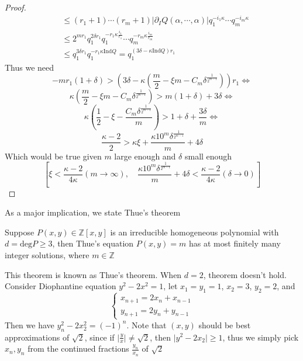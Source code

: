 \begin{proof}
$$\begin{aligned}
&\leq (r_{1}+1)\cdots(r_{m}+1) |\partial_{I}Q(\alpha,\cdots,\alpha)|
q_{1}^{-i_{1}\kappa}\cdots q_{m}^{-i_{m}\kappa} \\
&\leq 2^{mr_{1}}q_{1}^{2\delta r_{1}}q_{1}^{-r_{1}\kappa\frac{i_{1}}{r_{1}}}\cdots q_{m}^{-r_{m}\kappa\frac{i_{m}}{r_{m}}} \\
&\leq q_{1}^{3\delta r_{1}} q_{1}^{-r_{1}\kappa \mathrm{Ind}Q} = q_{1}^{(3\delta-\kappa \mathrm{Ind}Q)r_{1}}
\end{aligned}
$$
Thus we need
$$ -mr_{1}(1+\delta) > \left(3\delta-\kappa\left(\dfrac{m}{2}-\xi m-C_{m}\delta^{\frac{1}{2^{m-1}}}\right)\right)r_{1} \Leftrightarrow $$
$$ \kappa\left(\dfrac{m}{2}-\xi m-C_{m}\delta^{\frac{1}{2^{m-1}}}\right) > m(1+\delta)+3\delta \Leftrightarrow $$
$$ \kappa\left(\dfrac{1}{2}-\xi-\dfrac{C_{m}\delta^{\frac{1}{2^{m-1}}}}{m}\right) > 1+\delta+\dfrac{3\delta}{m} \Leftrightarrow $$
$$ \dfrac{\kappa-2}{2} > \kappa\xi + \dfrac{\kappa 10^{m}\delta^{\frac{1}{2^{m-1}}}}{m} + 4\delta $$
Which would be true given $ m $ large enough and $ \delta $ small enough
$$ \left[ \xi < \dfrac{\kappa-2}{4\kappa} (m\rightarrow\infty),\quad 
\dfrac{\kappa 10^{m}\delta^{\frac{1}{2^{m-1}}}}{m} + 4\delta < \dfrac{\kappa-2}{4\kappa} (\delta\rightarrow 0) \right] $$
\end{proof}

As a major implication, we state Thue's theorem

\begin{theorem}\label{theorem 42}
Suppose $ P(x,y) \in \mathbb{Z}[x,y] $ is an irreducible homogeneous polynomial with $ d=\mathrm{deg} P \geq 3 $, then Thue's equation $ P(x,y)=m $ has at most finitely many integer solutions, where $ m \in \mathbb{Z} $
\end{theorem}

\begin{remark}
This theorem is known as Thue's theorem. When $ d=2 $, theorem doesn't hold. Consider Diophantine equation $ y^{2}-2x^{2}=1 $, let $ x_{1}=y_{1}=1 $, $ x_{2}=3 $, $ y_{2} = 2 $, and 
$$
\left\{
\begin{aligned}
x_{n+1}=2x_{n}+x_{n-1} \\
y_{n+1}=2y_{n}+y_{n-1}
\end{aligned} 
\right.
$$
Then we have $ y_{n}^{2}-2x_{2}^{2}=(-1)^{n} $. Note that $ (x,y) $ should be best approximations of $ \sqrt{2} $, since if $ \Big| \frac{y}{x} \Big| \neq \sqrt{2} $, then $ \Big|y^{2}-2x_{2}\Big| \geq 1 $, thus we simply pick $ x_{n},y_{n} $ from the continued fractions $ \frac{y_{n}}{x_{n}} $ of $ \sqrt{2} $
\end{remark}

